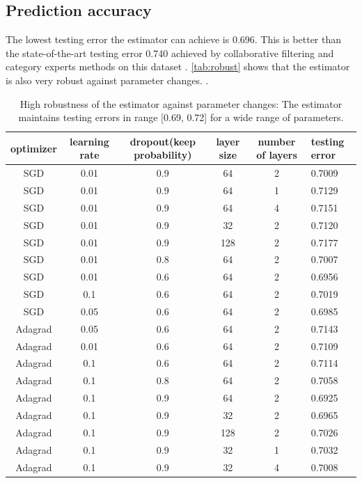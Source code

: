 \documentclass{article}
\begin{document}
\subsection{Prediction accuracy}
The lowest testing error the estimator can achieve is 0.696.
This is better than the state-of-the-art testing error 0.740 achieved by 
collaborative filtering and category experts methods on this dataset 
\cite{hwang2016efficient}.
\autoref{tab:robust} shows that the estimator is also very robust against 
parameter changes.
.
\begin{table}[h]
	\centering
	\begin{tabularx}{\textwidth}{ |c|c|c|c|c|X| } \hline
		optimizer  & learning rate & dropout(keep probability) & layer size & 
		number of layers & 
		testing error \\ \hline
		SGD & 0.01 & 0.9 & 64 & 2 & 0.7009 \\ \hline
		SGD & 0.01 & 0.9 & 64 & 1 & 0.7129 \\ \hline
		SGD & 0.01 & 0.9 & 64 & 4 & 0.7151 \\ \hline
		SGD & 0.01 & 0.9 & 32 & 2 & 0.7120 \\ \hline
		SGD & 0.01 & 0.9 & 128 & 2 & 0.7177 \\ \hline
		SGD & 0.01 & 0.8 & 64 & 2 & 0.7007 \\ \hline
		SGD & 0.01 & 0.6 & 64 & 2 & 0.6956 \\ \hline
		SGD & 0.1 & 0.6 & 64 & 2 & 0.7019 \\ \hline
		SGD & 0.05 & 0.6 & 64 & 2 & 0.6985 \\ \hline
		Adagrad & 0.05 & 0.6 & 64 & 2 & 0.7143 \\ \hline
		Adagrad & 0.01 & 0.6 & 64 & 2 & 0.7109 \\ \hline
		Adagrad & 0.1 & 0.6 & 64 & 2 & 0.7114 \\ \hline
		Adagrad & 0.1 & 0.8 & 64 & 2 & 0.7058 \\ \hline
		Adagrad & 0.1 & 0.9 & 64 & 2 & 0.6925 \\ \hline
		Adagrad & 0.1 & 0.9 & 32 & 2 & 0.6965 \\ \hline
		Adagrad & 0.1 & 0.9 & 128 & 2 & 0.7026 \\ \hline
		Adagrad & 0.1 & 0.9 & 32 & 1 & 0.7032 \\ \hline
		Adagrad & 0.1 & 0.9 & 32 & 4 & 0.7008 \\ \hline
	\end{tabularx}
	\caption{High robustness of the estimator against parameter changes: 
	The estimator maintains testing errors in range [0.69, 0.72] for a wide 
	range of parameters.}
	\label{tab:robust}
\end{table}
\end{document}
